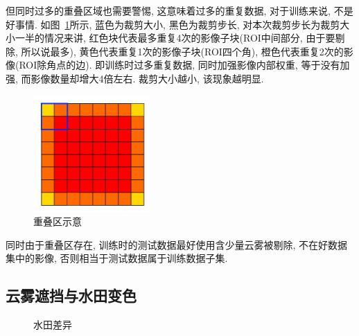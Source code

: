 但同时过多的重叠区域也需要警惕, 这意味着过多的重复数据, 对于训练来说, 不是好事情. 如图~\ref{fig:0203}所示, 蓝色为裁剪大小, 黑色为裁剪步长, 对本次裁剪步长为裁剪大小一半的情况来讲, 红色块代表最多重复4次的影像子块(ROI中间部分, 由于要剔除, 所以说最多), 黄色代表重复1次的影像子块(ROI四个角), 橙色代表重复2次的影像(ROI除角点的边). 即训练时过多重复数据, 同时加强影像内部权重, 等于没有加强, 而影像数量却增大4倍左右. 裁剪大小越小, 该现象越明显. 

\begin{figure}[!htbp]
    \centering
    \includegraphics[height=12em]{pic/q0204.jpg}
    \caption{重叠区示意}
    \label{fig:0203}
\end{figure}

同时由于重叠区存在, 训练时的测试数据最好使用含少量云雾被剔除, 不在好数据集中的影像, 否则相当于测试数据属于训练数据子集. 

\subsection{云雾遮挡与水田变色}

\begin{figure}[!htbp]
    \centering
    \qquad
    \caption{水田差异}
    \label{fig:0204}
\end{figure}

